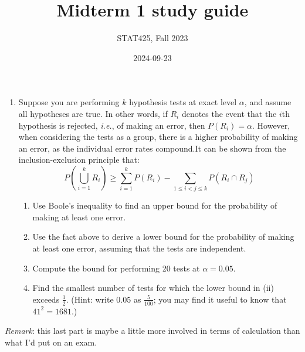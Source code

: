 \documentclass[
  letterpaper,
  DIV=11,
  numbers=noendperiod]{scrartcl}
\title{Midterm 1 study guide}
\author{STAT425, Fall 2023}
\date{2024-09-23}
\providecommand{\tightlist}{%
  \setlength{\itemsep}{0pt}\setlength{\parskip}{0pt}}\usepackage{longtable,booktabs,array}
\begin{document}
\maketitle

\pagestyle{fancy}  

\begin{enumerate}
\def\labelenumi{\arabic{enumi}.}
\tightlist
\item
  Suppose you are performing \(k\) hypothesis tests at exact level
  \(\alpha\), and assume all hypotheses are true. In other words, if
  \(R_i\) denotes the event that the \(i\)th hypothesis is rejected,
  \emph{i.e.}, of making an error, then \(P(R_i) = \alpha\). However,
  when considering the tests as a group, there is a higher probability
  of making an error, as the individual error rates compound.It can be
  shown from the inclusion-exclusion principle that: \[
  P\left(\bigcup_{i = 1}^k R_i\right) \geq \sum_{i = 1}^k P(R_i) - \sum_{1 \leq i < j \leq k} P(R_i \cap R_j)
  \]

  \begin{enumerate}
  \def\labelenumii{\roman{enumii}.}
  \tightlist
  \item
    Use Boole's inequality to find an upper bound for the probability of
    making at least one error.
  \item
    Use the fact above to derive a lower bound for the probability of
    making at least one error, assuming that the tests are independent.
  \item
    Compute the bound for performing 20 tests at \(\alpha = 0.05\).
  \item
    Find the smallest number of tests for which the lower bound in (ii)
    exceeds \(\frac{1}{2}\). (Hint: write \(0.05\) as \(\frac{5}{100}\);
    you may find it useful to know that \(41^2 = 1681\).)
  \end{enumerate}
\end{enumerate}

\emph{Remark}: this last part is maybe a little more involved in terms
of calculation than what I'd put on an exam.
\end{document}

